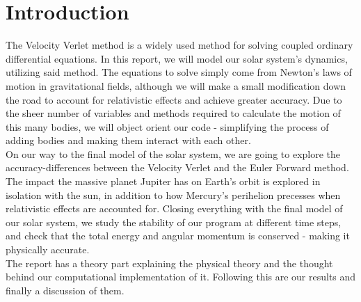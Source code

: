 \documentclass[../main.tex]{subfiles}
\begin{document}
\section{Introduction}\label{introduction}
The Velocity Verlet method is a widely used method for solving coupled ordinary differential equations. In this report, we will model our solar system's dynamics, utilizing said method. The equations to solve simply come from Newton's laws of motion in gravitational fields, although we will make a small modification down the road to account for relativistic effects and achieve greater accuracy. Due to the sheer number of variables and methods required to calculate the motion of this many bodies, we will object orient our code - simplifying the process of adding bodies and making them interact with each other. \\
On our way to the final model of the solar system, we are going to explore the accuracy-differences between the Velocity Verlet and the Euler Forward method. The impact the massive planet Jupiter has on Earth's orbit is explored in isolation with the sun, in addition to how Mercury's perihelion precesses when relativistic effects are accounted for. Closing everything with the final model of our solar system, we study the stability of our program at different time steps, and check that the total energy and angular momentum is conserved - making it physically accurate. \\
The report has a theory part explaining the physical theory and the thought behind our computational implementation of it. Following this are our results and finally a discussion of them. 
\end{document}
